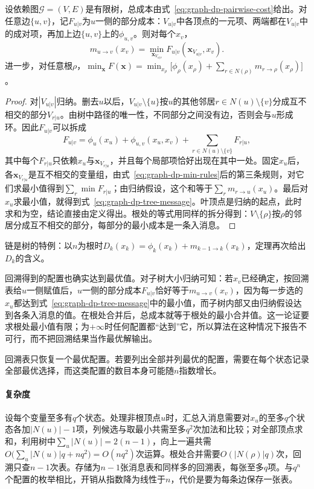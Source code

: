 \begin{theorem}[树上消息的含义]
\label{thm:graph-dp-tree-message}
设依赖图$\mathcal G=(V,E)$是有限树，总成本由式~\eqref{eq:graph-dp-pairwise-cost}给出。对任意边$\{u,v\}$，记$F_{u|v}$为$u$一侧的部分成本：$V_{u|v}$中各顶点的一元项、两端都在$V_{u|v}$中的成对项，再加上边$\{u,v\}$上的$\phi_{u,v}$。则对每个$x_v$，
\[
m_{u\to v}(x_v)=\min_{\bm x_{V_{u|v}}}F_{u|v}(\bm x_{V_{u|v}},x_v).
\]
进一步，对任意根$\rho$，$\min_{\bm x}F(\bm x)=\min_{x_\rho}\bigl[\phi_\rho(x_\rho)+\sum_{r\in N(\rho)}m_{r\to\rho}(x_\rho)\bigr]$。
\end{theorem}

\begin{proof}
对$|V_{u|v}|$归纳。删去$u$以后，$V_{u|v}\setminus\{u\}$按$u$的其他邻居$r\in N(u)\setminus\{v\}$分成互不相交的部分$V_{r|u}$。由树中路径的唯一性，不同部分之间没有边，否则会与$u$形成环。因此$F_{u|v}$可以拆成
\[
F_{u|v}=\phi_u(x_u)+\phi_{u,v}(x_u,x_v)+\sum_{r\in N(u)\setminus\{v\}}F_{r|u},
\]
其中每个$F_{r|u}$只依赖$x_u$与$\bm x_{V_{r|u}}$，并且每个局部项恰好出现在其中一处。固定$x_u$后，各$\bm x_{V_{r|u}}$是互不相交的变量组，由式~\eqref{eq:graph-dp-min-rules}后的第三条规则，对它们求最小值得到$\sum_r\min F_{r|u}$；由归纳假设，这个和等于$\sum_r m_{r\to u}(x_u)$。最后对$x_u$求最小值，就得到式~\eqref{eq:graph-dp-tree-message}。叶顶点是归纳的起点，此时求和为空，结论直接由定义得出。根处的等式用同样的拆分得到：$V\setminus\{\rho\}$按$\rho$的邻居分成互不相交的部分，每部分的最小成本是一条入消息。
\end{proof}

链是树的特例：以$n$为根时$D_k(x_k)=\phi_k(x_k)+m_{k-1\to k}(x_k)$，定理再次给出$D_k$的含义。

回溯得到的配置也确实达到最优值。对子树大小归纳可知：若$x_v$已经确定，按回溯表给$u$一侧赋值后，$u$一侧的部分成本$F_{u|v}$恰好等于$m_{u\to v}(x_v)$，因为每一步选的$x_u$都达到式~\eqref{eq:graph-dp-tree-message}中的最小值，而子树内部又由归纳假设达到各条入消息的值。在根处合并后，总成本就等于根处的最小合并值。这一论证要求根处最小值有限；为$+\infty$时任何配置都“达到”它，所以算法在这种情况下报告不可行，而不把回溯结果当作最优解输出。

回溯表只恢复一个最优配置。若要列出全部并列最优的配置，需要在每个状态记录全部最优选择，而这类配置的数目本身可能随$n$指数增长。

\paragraph{复杂度}
设每个变量至多有$q$个状态。处理非根顶点$u$时，汇总入消息需要对$x_u$的至多$q$个状态各加$|N(u)|-1$项，列候选与取最小共需至多$q^2$次加法和比较；对全部顶点求和，利用树中$\sum_u|N(u)|=2(n-1)$，向上一遍共需$O\bigl(\sum_u|N(u)|q+nq^2\bigr)=O(nq^2)$次运算。根处合并需要$O(|N(\rho)|q)$次，回溯只查$n-1$次表。存储为$n-1$张消息表和同样多的回溯表，每张至多$q$项。与$q^n$个配置的枚举相比，开销从指数降为线性于$n$，代价是要为每条边保存一张表。

